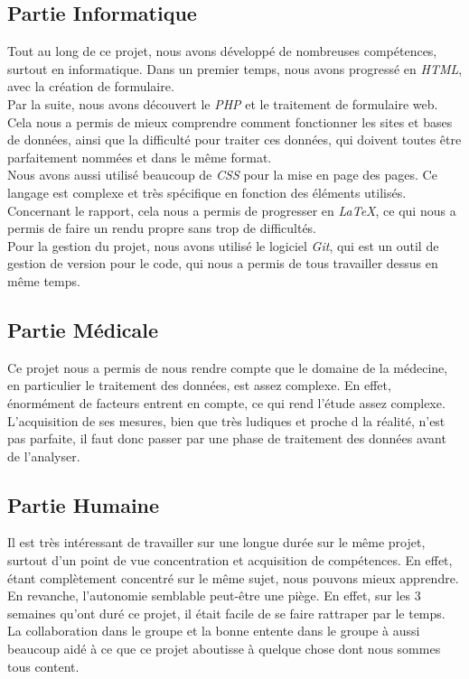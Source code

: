     \subsection{Partie Informatique}
Tout au long de ce projet, nous avons développé de nombreuses compétences, surtout en informatique.
Dans un premier temps, nous avons progressé en \textit{HTML}, avec la création de formulaire.
\\
Par la suite, nous avons découvert le \textit{PHP} et le traitement de formulaire web. Cela nous a permis de mieux comprendre comment fonctionner les sites et bases de données, ainsi que la difficulté pour traiter ces données, qui doivent toutes être parfaitement nommées et dans le même format.
\\
Nous avons aussi utilisé beaucoup de \textit{CSS} pour la mise en page des pages. Ce langage est complexe et très spécifique en fonction des éléments utilisés.
\\
Concernant le rapport, cela nous a permis de progresser en \textit{LaTeX}, ce qui nous a permis de faire un rendu propre sans trop de difficultés.
\\
Pour la gestion du projet, nous avons utilisé le logiciel \textit{Git}, qui est un outil de gestion de version pour le code, qui nous a permis de tous travailler dessus en même temps.

    \subsection{Partie Médicale}
Ce projet nous a permis de nous rendre compte que le domaine de la médecine, en particulier le traitement des données, est assez complexe. En effet, énormément de facteurs entrent en compte, ce qui rend l'étude assez complexe.
\\
L'acquisition de ses mesures, bien que très ludiques et proche d la réalité, n'est pas parfaite, il faut donc passer par une phase de traitement des données avant de l’analyser.

    \subsection{Partie Humaine}
Il est très intéressant de travailler sur une longue durée sur le même projet, surtout d'un point de vue concentration et acquisition de compétences. En effet, étant complètement concentré sur le même sujet, nous pouvons mieux apprendre. En revanche, l'autonomie semblable peut-être une piège. En effet, sur les 3 semaines qu'ont duré ce projet, il était facile de se faire rattraper par le temps.
\\
La collaboration dans le groupe et la bonne entente dans le groupe à aussi beaucoup aidé à ce que ce projet aboutisse à quelque chose dont nous sommes tous content.
